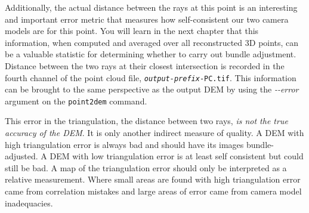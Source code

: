 Additionally, the actual distance between the rays at this point is an
interesting and important error metric that measures how
self-consistent our two camera models are for this point.  You will
learn in the next chapter that this information, when computed and
averaged over all reconstructed 3D points, can be a valuable statistic
for determining whether to carry out bundle adjustment. Distance
between the two rays at their closest intersection is recorded in the
fourth channel of the point cloud file,
\texttt{\textit{output-prefix}-PC.tif}. This information can be
brought to the same perspective as the output DEM by using the
\textit{-\/-error} argument on the \texttt{point2dem} command.

This error in the triangulation, the distance between two rays,
\emph{is not the true accuracy of the DEM}. It is only another
indirect measure of quality. A DEM with high triangulation error
is always bad and should have its images bundle-adjusted. A DEM
with low triangulation error is at least self consistent but could
still be bad. A map of the triangulation error should only be
interpreted as a relative measurement. Where small areas are found
with high triangulation error came from correlation mistakes and
large areas of error came from camera model inadequacies.
